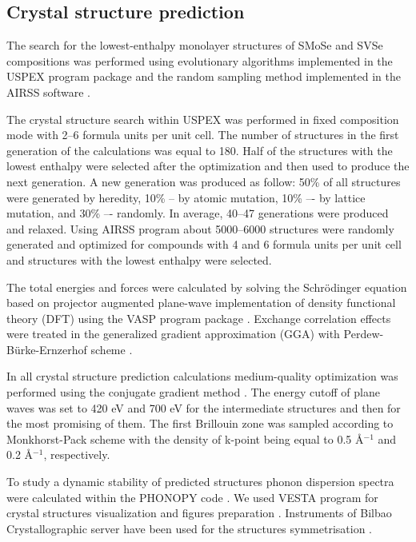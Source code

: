 \documentclass[a4paperm]{article}
\begin{document}
\subsection*{Crystal structure prediction}


The search for the lowest-enthalpy monolayer structures of SMoSe and SVSe compositions was performed using evolutionary algorithms implemented in the USPEX program package \cite{uspex1,uspex2,uspex3} and the random sampling method implemented in the AIRSS software \cite{airss1,airss2}.

The crystal structure search within USPEX was performed in fixed composition mode with 2--6 formula units per unit cell.
The number of structures in the first generation of the calculations was equal to 180.
Half of the structures with the lowest enthalpy were selected after the optimization and then used to produce the next generation.
A new generation was produced as follow: 50\% of all structures were generated by heredity, 10\% -- by atomic mutation, 10\% –- by lattice mutation, and 30\% –- randomly.
In average, 40--47 generations were produced and relaxed.
Using AIRSS program about 5000--6000 structures were randomly generated and optimized for compounds with 4 and 6 formula units per unit cell and structures with the lowest enthalpy were selected.

The total energies and forces were calculated by solving the Schr\"{o}dinger equation based on projector augmented plane-wave implementation \cite{blochl1994projector} of density functional theory (DFT) using the VASP program package \cite{vasp1,vasp2}.
Exchange correlation effects were treated in the generalized gradient approximation (GGA) with Perdew-B\"{u}rke-Ernzerhof scheme \cite{pbe}.

In all crystal structure prediction calculations medium-quality optimization was performed using the conjugate gradient method \cite{conjugate_gradient}. 
The energy cutoff of plane waves was set to 420 eV and 700 eV for the intermediate structures and then for the most promising of them. 
The first Brillouin zone was sampled according to Monkhorst-Pack scheme \cite{monkhorst1976special} with the density of k-point being equal to 0.5 \AA$^{-1}$ and 0.2 \AA$^{-1}$, respectively. 

To study a dynamic stability of predicted structures phonon dispersion spectra were calculated within the PHONOPY code \cite{phonopy}. 
We used VESTA program for crystal structures visualization and figures preparation \cite{momma2011vesta}.
Instruments of Bilbao Crystallographic server have been used for the structures symmetrisation \cite{bilbao}.
\end{document}

